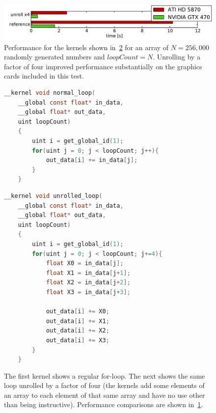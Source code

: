 \documentclass[11pt,twoside]{report}
\begin{document}
\begin{figure}[htbp]
	\vspace{-20pt}
	\begin{center}
		\includegraphics[width=\textwidth]{img/unroll_performance.pdf}		
	\end{center}
	\vspace{-10pt}
	\caption{Performance for the kernels shown in~\cref{code:unroll_example} for an array of $N = 256,000$ randomly generated numbers and $loopCount = N$. Unrolling by a factor of four improved performance substantially on the graphics cards included in this test.\label{fig:unroll_performance}}
	
\end{figure}



\begin{figure}[htbp]
	\vspace{-20pt}
	\begin{center}

	\begin{lstlisting}[language=C, style=my_C]
	__kernel void normal_loop(
	__global const float* in_data,
	__global float* out_data,
	uint loopCount)
	{
		uint i = get_global_id(1);
		for(uint j = 0; j < loopCount; j++){			
			out_data[i] += in_data[j];					
		}		
	}
	\end{lstlisting}
\vspace{-25px}
	\begin{lstlisting}[language=C, style=my_C]	
	__kernel void unrolled_loop(
	__global const float* in_data,
	__global float* out_data,
	uint loopCount)
	{
		uint i = get_global_id(1);
		for(uint j = 0; j < loopCount; j+=4){
			float X0 = in_data[j];
			float X1 = in_data[j+1];
			float X2 = in_data[j+2];
			float X3 = in_data[j+3];

			out_data[i] += X0;	
			out_data[i] += X1;			
			out_data[i] += X2;			
			out_data[i] += X3;							
		}		
	}
	\end{lstlisting}


\caption{The first kernel shows a regular for-loop. The next shows the same loop unrolled by a factor of four (the kernels add some elements of an array to each element of that same array and have no use other than being instructive). Performance comparisons are shown in~\cref{fig:unroll_performance}.\label{code:unroll_example}}
\end{center}

\end{figure}
\end{document}
